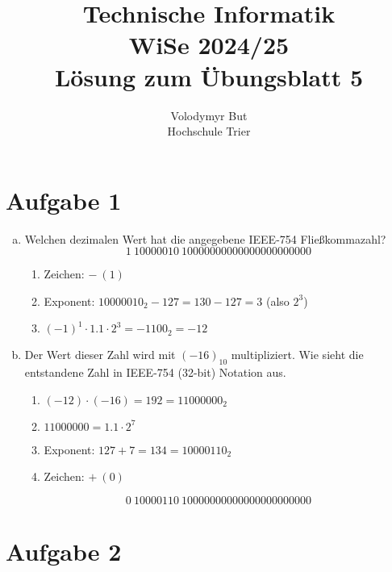 \documentclass[10pt, oneside]{article}
\title{Technische Informatik\\[10pt]\Large{WiSe 2024/25}\\[15pt]\Large{L{\"o}sung zum {\"U}bungsblatt 5}}
\author{Volodymyr But\\[10pt]Hochschule Trier}
\date{}
\begin{document}
\maketitle
\vspace{25px}

\section{Aufgabe 1}

\begin{enumerate}[(a)]
    \item Welchen dezimalen Wert hat die angegebene IEEE-754 Flie{\ss}kommazahl?
        \begin{equation*}
            1\ 10000010\ 10000000000000000000000
        \end{equation*}
        \begin{enumerate}[1.]
            \item Zeichen: $-\ (1)$
            \item Exponent: $10000010_2 - 127 = 130 - 127 = 3$ (also $2^3$)
            \item $(-1)^1 \cdot 1.1 \cdot 2^3 = -1100_2 = -12$
        \end{enumerate}

    \item Der Wert dieser Zahl wird mit $(-16)_10$ multipliziert. Wie sieht die
        entstandene Zahl in IEEE-754 (32-bit) Notation aus.
        \begin{enumerate}[1.]
            \item $(-12) \cdot (-16) = 192 = 11000000_2$
            \item $11000000 = 1.1 \cdot 2^7$
            \item Exponent: $127 + 7 = 134 = 10000110_2$
            \item Zeichen: $+\ (0)$
        \end{enumerate}
        \begin{equation*}
            0\ 10000110\ 10000000000000000000000
        \end{equation*}
\end{enumerate}

\section{Aufgabe 2}
\end{document}
